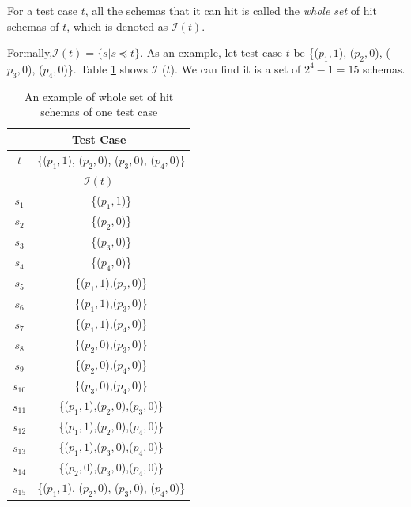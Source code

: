 \begin{definition} \label{de:allschemas}
For a test case $t$, all the schemas that it can hit is called the \emph{whole set} of hit schemas of $t$, which is denoted as $\mathcal{I}(t)$.
\end{definition}

Formally,$\mathcal{I}(t) = \{ s | s \preceq t \}$. As an example, let test case $t$ be  \{($p_{1}, 1$), ($p_{2}, 0$), ($p_{3}, 0$), ($p_{4}, 0$)\}. Table \ref{ex:wholesetofhitschemas} shows $\mathcal{I}$ ($t$). We can find it is a set of $2^{4} - 1 = 15$ schemas.

\begin{table}[htbp]
  \centering
  \caption{An example of whole set of hit schemas of one test case}
      \label{ex:wholesetofhitschemas}
    \begin{tabular}{|c|c|} \hline
   \multicolumn{2}{|c|}{\textbf{Test Case}} \\ \hline
   $t$ & \{($p_{1}, 1$), ($p_{2}, 0$), ($p_{3}, 0$), ($p_{4}, 0$)\} \\ \hline
    \multicolumn{2}{|c|}{\textbf{ $\mathcal{I}(t)$ }}\\ \hline
   $s_{1}$ & \{($p_{1}, 1$)\} \\
   $s_{2}$ & \{($p_{2}, 0$)\} \\
   $s_{3}$ & \{($p_{3}, 0$)\} \\
   $s_{4}$ & \{($p_{4}, 0$)\} \\
   $s_{5}$ & \{($p_{1}, 1$),($p_{2}, 0$)\} \\
   $s_{6}$ & \{($p_{1}, 1$),($p_{3}, 0$)\} \\
   $s_{7}$ & \{($p_{1}, 1$),($p_{4}, 0$)\} \\
   $s_{8}$ & \{($p_{2}, 0$),($p_{3}, 0$)\} \\
   $s_{9}$ & \{($p_{2}, 0$),($p_{4}, 0$)\} \\
   $s_{10}$ & \{($p_{3}, 0$),($p_{4}, 0$)\} \\
   $s_{11}$ & \{($p_{1}, 1$),($p_{2}, 0$),($p_{3}, 0$)\} \\
   $s_{12}$ & \{($p_{1}, 1$),($p_{2}, 0$),($p_{4}, 0$)\} \\
   $s_{13}$ & \{($p_{1}, 1$),($p_{3}, 0$),($p_{4}, 0$)\} \\
   $s_{14}$ & \{($p_{2}, 0$),($p_{3}, 0$),($p_{4}, 0$)\} \\
   $s_{15}$ & \{($p_{1}, 1$), ($p_{2}, 0$), ($p_{3}, 0$), ($p_{4}, 0$)\} \\ \hline
    \end{tabular}%
\end{table}%


